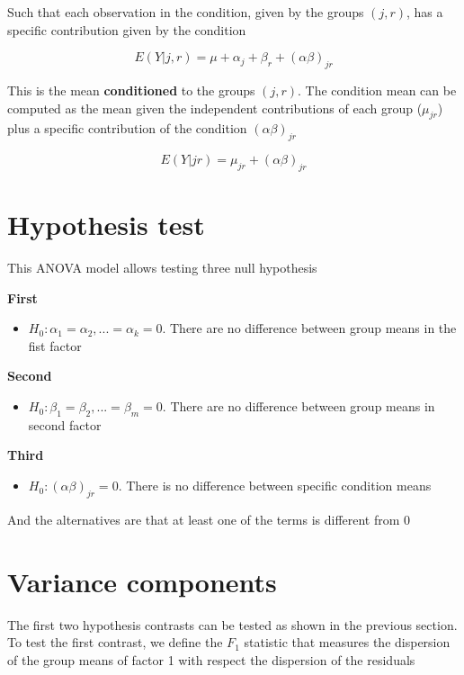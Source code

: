 \documentclass[
]{book}
\providecommand{\tightlist}{%
  \setlength{\itemsep}{0pt}\setlength{\parskip}{0pt}}
\begin{document}
Such that each observation in the condition, given by the groups \((j,r)\), has a specific contribution given by the condition

\[E(Y|j,r)=\mu + \alpha_j+ \beta_r + (\alpha\beta)_{jr}\]

This is the mean \textbf{conditioned} to the groups \((j,r)\). The condition mean can be computed as the mean given the independent contributions of each group (\(\mu_{jr}\)) plus a specific contribution of the condition \((\alpha\beta)_{jr}\)

\[E(Y|jr)=\mu_{jr}  + (\alpha\beta)_{jr}\]

\hypertarget{hypothesis-test-4}{%
\section{Hypothesis test}\label{hypothesis-test-4}}

This ANOVA model allows testing three null hypothesis

\textbf{First}

\begin{itemize}
\tightlist
\item
  \(H_0: \alpha_1=\alpha_2, ...=\alpha_k=0\). There are no difference between group means in the fist factor
\end{itemize}

\textbf{Second}

\begin{itemize}
\tightlist
\item
  \(H_0: \beta_1=\beta_2, ...=\beta_m=0\). There are no difference between group means in second factor
\end{itemize}

\textbf{Third}

\begin{itemize}
\tightlist
\item
  \(H_0: (\alpha\beta)_{jr}=0\). There is no difference between specific condition means
\end{itemize}

And the alternatives are that at least one of the terms is different from \(0\)

\hypertarget{variance-components-1}{%
\section{Variance components}\label{variance-components-1}}

The first two hypothesis contrasts can be tested as shown in the previous section. To test the first contrast, we define the \(F_1\) statistic that measures the dispersion of the group means of factor 1 with respect the dispersion of the residuals
\end{document}
